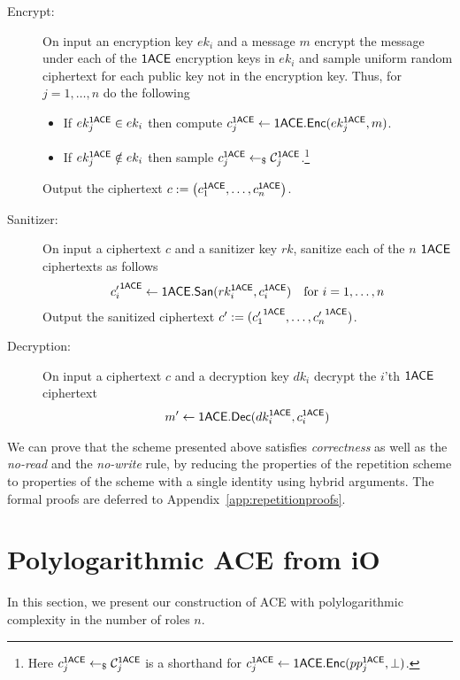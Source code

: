 \documentclass{llncs}
\begin{document}
\begin{description}
\item[Encrypt:] On input an encryption key $ek_i$ and a message $m$ encrypt the message under each of the $\mathsf{1ACE}$ encryption keys in $ek_i$ and sample uniform random ciphertext for each public key not in the encryption key. 
Thus, for $j = 1,\dots,n$ do the following
\begin{itemize}
\item If $ek_j^{\mathsf{1ACE}} \in ek_i$ then compute $c_j^{\mathsf{1ACE}} \gets \mathsf{1ACE}.\mathsf{Enc}(ek_j^{\mathsf{1ACE}}, m)$.

\item If $ek_j^{\mathsf{1ACE}} \notin ek_i$ then sample $c_j^{\mathsf{1ACE}} \gets_\$ \mathcal{C}_j^{\mathsf{1ACE}}$.\footnote{Here $c_j^{\mathsf{1ACE}} \gets_\$ \mathcal{C}_j^{\mathsf{1ACE}}$ is a shorthand for $c_j^{\mathsf{1ACE}} \gets \mathsf{1ACE}.\mathsf{Enc}(pp_j^{\mathsf{1ACE}}, \bot)$.}
\end{itemize}
Output the ciphertext $c := \left( c_1^{\mathsf{1ACE}}, \dots, c_n^{\mathsf{1ACE}}  \right)$.


\item[Sanitizer:] On input a ciphertext $c$ and a sanitizer key $rk$, sanitize each of the $n$ $\mathsf{1ACE}$ ciphertexts as follows
\begin{align*}
	{c'_i}^{\mathsf{1ACE}} \gets \mathsf{1ACE}.\mathsf{San}(rk_i^{\mathsf{1ACE}},c_i^{\mathsf{1ACE}}) \quad \text{for } i = 1,\dots,n
\end{align*} 
Output the sanitized ciphertext $c' := ({c'_1}^{\mathsf{1ACE}},\dots,{c'_n}^{\mathsf{1ACE}})$.

\item[Decryption:] On input a ciphertext $c$ and a decryption key $dk_i$ decrypt the $i$'th $\mathsf{1ACE}$ ciphertext
\begin{align*}
	m' \gets \mathsf{1ACE}.\mathsf{Dec}(dk_i^{\mathsf{1ACE}},c_i^{\mathsf{1ACE}})
\end{align*}
\end{description}

We can prove that the scheme presented above satisfies \emph{correctness} as well as the \emph{no-read} and the \emph{no-write} rule, by reducing the properties of the repetition scheme to properties of the scheme with a single identity using hybrid arguments. The formal proofs are deferred to Appendix~\ref{app:repetitionproofs}. 


\section{Polylogarithmic ACE from iO}\label{sec:polylog}


In this section, we present our construction of ACE with polylogarithmic complexity in the number of roles $n$.
\end{document}
